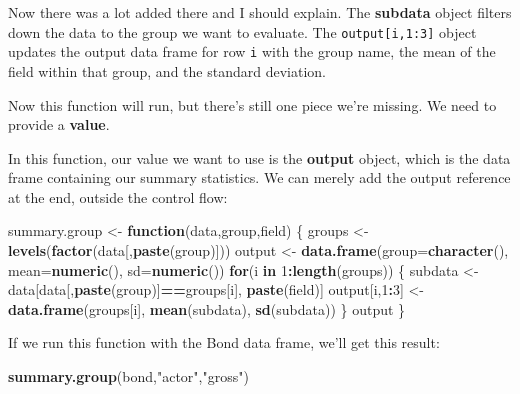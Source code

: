 \documentclass[
]{book}
\newenvironment{Shaded}{\begin{snugshade}}{\end{snugshade}}
\newcommand{\ControlFlowTok}[1]{\textcolor[rgb]{0.13,0.29,0.53}{\textbf{#1}}}
\newcommand{\DataTypeTok}[1]{\textcolor[rgb]{0.13,0.29,0.53}{#1}}
\newcommand{\DecValTok}[1]{\textcolor[rgb]{0.00,0.00,0.81}{#1}}
\newcommand{\KeywordTok}[1]{\textcolor[rgb]{0.13,0.29,0.53}{\textbf{#1}}}
\newcommand{\NormalTok}[1]{#1}
\newcommand{\OperatorTok}[1]{\textcolor[rgb]{0.81,0.36,0.00}{\textbf{#1}}}
\newcommand{\StringTok}[1]{\textcolor[rgb]{0.31,0.60,0.02}{#1}}
\begin{document}
\begin{center}
Now there was a lot added there and I should explain. The \textbf{subdata} object filters down the data to the group we want to evaluate. The \texttt{output{[}i,1:3{]}} object updates the output data frame for row \texttt{i} with the group name, the mean of the field within that group, and the standard deviation.

Now this function will run, but there's still one piece we're missing. We need to provide a \textbf{value}.

In this function, our value we want to use is the \textbf{output} object, which is the data frame containing our summary statistics. We can merely add the output reference at the end, outside the control flow:

\begin{Shaded}
\begin{Highlighting}[]
\NormalTok{summary.group <-}\StringTok{ }\ControlFlowTok{function}\NormalTok{(data,group,field) \{}
\NormalTok{  groups <-}\StringTok{ }\KeywordTok{levels}\NormalTok{(}\KeywordTok{factor}\NormalTok{(data[,}\KeywordTok{paste}\NormalTok{(group)]))}
\NormalTok{  output <-}\StringTok{ }\KeywordTok{data.frame}\NormalTok{(}\DataTypeTok{group=}\KeywordTok{character}\NormalTok{(),}
                       \DataTypeTok{mean=}\KeywordTok{numeric}\NormalTok{(),}
                       \DataTypeTok{sd=}\KeywordTok{numeric}\NormalTok{())}
  \ControlFlowTok{for}\NormalTok{(i }\ControlFlowTok{in} \DecValTok{1}\OperatorTok{:}\KeywordTok{length}\NormalTok{(groups)) \{}
\NormalTok{    subdata <-}\StringTok{ }\NormalTok{data[data[,}\KeywordTok{paste}\NormalTok{(group)]}\OperatorTok{==}\NormalTok{groups[i],}
                    \KeywordTok{paste}\NormalTok{(field)]}
\NormalTok{    output[i,}\DecValTok{1}\OperatorTok{:}\DecValTok{3}\NormalTok{] <-}\StringTok{ }\KeywordTok{data.frame}\NormalTok{(groups[i],}
                                \KeywordTok{mean}\NormalTok{(subdata),}
                                \KeywordTok{sd}\NormalTok{(subdata))}
\NormalTok{    \}}
\NormalTok{  output}
\NormalTok{  \}}
\end{Highlighting}
\end{Shaded}

If we run this function with the Bond data frame, we'll get this result:

\begin{Shaded}
\begin{Highlighting}[]
\KeywordTok{summary.group}\NormalTok{(bond,}\StringTok{"actor"}\NormalTok{,}\StringTok{"gross"}\NormalTok{)}
\end{Highlighting}
\end{Shaded}


\end{center}
\end{document}
